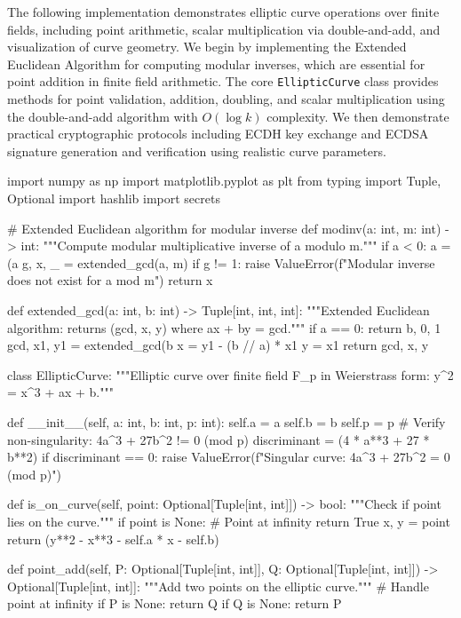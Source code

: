 \documentclass[a4paper, 11pt]{article}
\begin{document}
The following implementation demonstrates elliptic curve operations over finite fields, including point arithmetic, scalar multiplication via double-and-add, and visualization of curve geometry. We begin by implementing the Extended Euclidean Algorithm for computing modular inverses, which are essential for point addition in finite field arithmetic. The core \texttt{EllipticCurve} class provides methods for point validation, addition, doubling, and scalar multiplication using the double-and-add algorithm with $O(\log k)$ complexity. We then demonstrate practical cryptographic protocols including ECDH key exchange and ECDSA signature generation and verification using realistic curve parameters.

\begin{pycode}
import numpy as np
import matplotlib.pyplot as plt
from typing import Tuple, Optional
import hashlib
import secrets

# Extended Euclidean algorithm for modular inverse
def modinv(a: int, m: int) -> int:
    """Compute modular multiplicative inverse of a modulo m."""
    if a < 0:
        a = (a %
    g, x, _ = extended_gcd(a, m)
    if g != 1:
        raise ValueError(f"Modular inverse does not exist for {a} mod {m}")
    return x %

def extended_gcd(a: int, b: int) -> Tuple[int, int, int]:
    """Extended Euclidean algorithm: returns (gcd, x, y) where ax + by = gcd."""
    if a == 0:
        return b, 0, 1
    gcd, x1, y1 = extended_gcd(b %
    x = y1 - (b // a) * x1
    y = x1
    return gcd, x, y

class EllipticCurve:
    """Elliptic curve over finite field F_p in Weierstrass form: y^2 = x^3 + ax + b."""

    def __init__(self, a: int, b: int, p: int):
        self.a = a
        self.b = b
        self.p = p
        # Verify non-singularity: 4a^3 + 27b^2 != 0 (mod p)
        discriminant = (4 * a**3 + 27 * b**2) %
        if discriminant == 0:
            raise ValueError(f"Singular curve: 4a^3 + 27b^2 = 0 (mod {p})")

    def is_on_curve(self, point: Optional[Tuple[int, int]]) -> bool:
        """Check if point lies on the curve."""
        if point is None:  # Point at infinity
            return True
        x, y = point
        return (y**2 - x**3 - self.a * x - self.b) %

    def point_add(self, P: Optional[Tuple[int, int]], Q: Optional[Tuple[int, int]]) -> Optional[Tuple[int, int]]:
        """Add two points on the elliptic curve."""
        # Handle point at infinity
        if P is None:
            return Q
        if Q is None:
            return P


\end{pycode}
\end{document}
